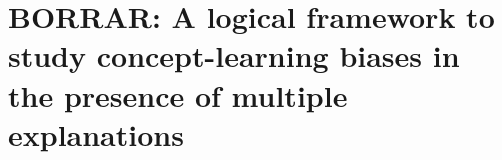 

\chapter{BORRAR: A logical framework to study concept-learning biases in the presence of multiple explanations}




